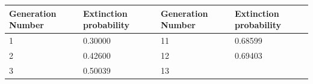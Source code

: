 \documentclass[]{book}
\begin{document}
\begin{longtable}[]{@{}llll@{}}
\toprule
\begin{minipage}[b]{0.22\columnwidth}\raggedright
Generation Number\strut
\end{minipage} & \begin{minipage}[b]{0.22\columnwidth}\raggedright
Extinction probability\strut
\end{minipage} & \begin{minipage}[b]{0.22\columnwidth}\raggedright
Generation Number\strut
\end{minipage} & \begin{minipage}[b]{0.22\columnwidth}\raggedright
Extinction probability\strut
\end{minipage}\tabularnewline
\midrule
\endhead
\begin{minipage}[t]{0.22\columnwidth}\raggedright
1\strut
\end{minipage} & \begin{minipage}[t]{0.22\columnwidth}\raggedright
0.30000\strut
\end{minipage} & \begin{minipage}[t]{0.22\columnwidth}\raggedright
11\strut
\end{minipage} & \begin{minipage}[t]{0.22\columnwidth}\raggedright
0.68599\strut
\end{minipage}\tabularnewline
\begin{minipage}[t]{0.22\columnwidth}\raggedright
2\strut
\end{minipage} & \begin{minipage}[t]{0.22\columnwidth}\raggedright
0.42600\strut
\end{minipage} & \begin{minipage}[t]{0.22\columnwidth}\raggedright
12\strut
\end{minipage} & \begin{minipage}[t]{0.22\columnwidth}\raggedright
0.69403\strut
\end{minipage}\tabularnewline
\begin{minipage}[t]{0.22\columnwidth}\raggedright
3\strut
\end{minipage} & \begin{minipage}[t]{0.22\columnwidth}\raggedright
0.50039\strut
\end{minipage} & \begin{minipage}[t]{0.22\columnwidth}\raggedright
13\strut
\end{minipage} & \begin{minipage}[t]{0.22\columnwidth}\raggedright

\end{minipage}
\end{longtable}
\end{document}
